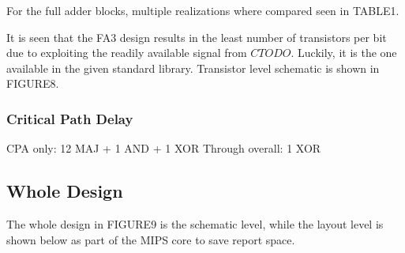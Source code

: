 \documentclass[conference]{IEEEtran}
\begin{document}
For the full adder blocks, multiple realizations where compared seen in TABLE1.


It is seen that the FA3 design results in the least number of transistors per bit due to exploiting the readily available signal from $CTODO$. Luckily, it is the one available in the given standard library. Transistor level schematic is shown in FIGURE8.

\subsubsection{Critical Path Delay}

CPA only: 12 MAJ + 1 AND + 1 XOR
Through overall: 1 XOR


\subsection{Whole Design}

The whole design in FIGURE9 is the schematic level, while the layout level is shown below as part of the MIPS core to save report space.






\end{document}
